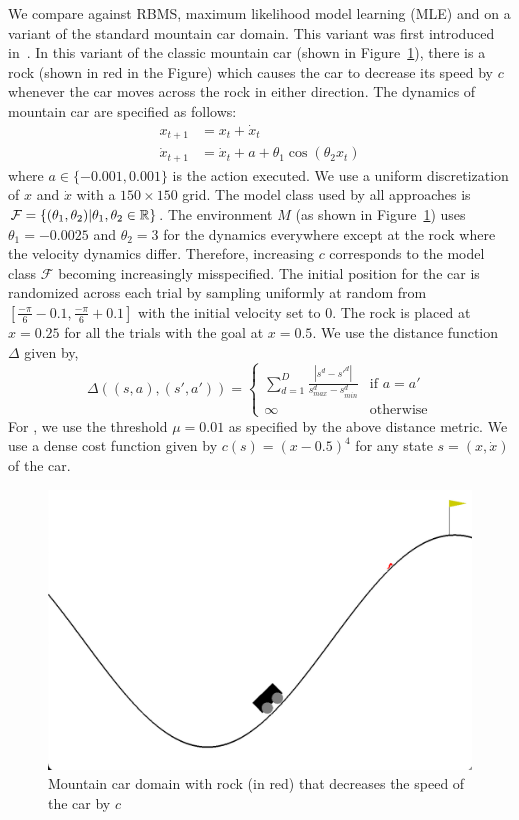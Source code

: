 We compare \taml{} against RBMS, maximum likelihood model learning
(MLE) and \cmax{} on a variant of the standard mountain car
domain. This variant 
was first introduced in~\cite{DBLP:conf/icra/JosephGRHR13}. In this
variant of the classic mountain car (shown in
Figure~\ref{fig:mountaincar}), there is a rock (shown in red in the
Figure) which causes the car to decrease its speed by $c$ whenever the
car moves across the rock in either direction. The dynamics of
mountain car are specified as follows:
\begin{align*}
  x_{t+1} &= x_t + \dot{x}_t \\
  \dot{x}_{t+1} &= \dot{x}_t + a + \theta_1\cos(\theta_2x_t)
\end{align*}
where $a \in \{-0.001, 0.001\}$ is the action executed. We use a
uniform discretization of $x$ and $\dot{x}$ with a $150 \times 150$
grid. The model class used by all approaches is $\mathcal{F} =
\{(\theta_1, \theta_2) | \theta_1, \theta_2 \in \mathbb{R}\}$. The
environment $M$ (as shown in Figure~\ref{fig:mountaincar}) uses
$\theta_1 = -0.0025$ and $\theta_2 = 3$ for the dynamics everywhere
except at the rock where the velocity dynamics differ. Therefore,
increasing $c$ corresponds to the model class $\mathcal{F}$ becoming
increasingly misspecified. The initial position for the car is randomized
across each trial by sampling uniformly at random from
$[\frac{-\pi}{6} - 0.1, \frac{-\pi}{6}+0.1]$ with the initial velocity
set to $0$. The rock is placed at $x = 0.25$ for all the trials with
the goal at $x = 0.5$. We use the distance function $\Delta$ given by,
\begin{equation}
  \label{eq:24}
  \Delta((s, a), (s', a')) =
  \begin{cases}
    \sum_{d=1}^D \frac{|s^d - s'^d|}{s^d_{max} - s^d_{min}} & \text{if
    } a = a' \\
    \infty & \text{otherwise}
  \end{cases}
\end{equation}
For \taml{}, we use the threshold $\mu = 0.01$ as specified by the
above distance metric. We use a dense cost function given by $c(s) =
(x - 0.5)^4$ for any state $s = (x, \dot{x})$ of the car.
\begin{figure}[t]
  \centering
  \includegraphics[width=0.5\linewidth]{figures/taml/mountaincar.png}
  \caption{Mountain car domain with rock (in red) that decreases the
    speed of the car by $c$}
  \label{fig:mountaincar}
\end{figure}


